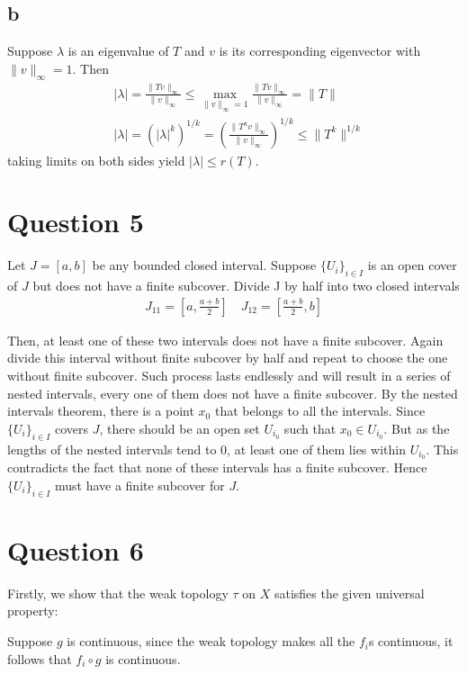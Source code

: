\documentclass{article}
\begin{document}
\subsection*{b}
Suppose $\lambda$ is an eigenvalue of $T$ and $v$ is its corresponding eigenvector with $\lVert v \rVert_\infty=1$. Then
\begin{align*}
	&|\lambda|=\frac{\lVert Tv\rVert_\infty}{\lVert v\rVert_\infty}\leq \max_{\lVert v\rVert_\infty=1}\frac{\lVert Tv\rVert_\infty}{\lVert v\rVert_\infty}=\lVert T\rVert \\
	&|\lambda |=(|\lambda|^k)^{1/k}=(\frac{\lVert T^k v\rVert_\infty}{\lVert v\rVert_\infty} )^{1/k}\leq \lVert T^k\rVert^{1/k}
\end{align*}
taking limits on both sides yield $|\lambda|\leq r(T)$.

\section*{Question 5}
Let $J=[a,b]$ be any bounded closed interval. Suppose $\{U_i\}_{i\in I}$ is an open cover of $J$ but does not have a finite subcover. Divide J by half into two closed intervals 
\begin{align*}
	J_{11}=[a,\frac{a+b}{2}] \quad  J_{12}=[\frac{a+b}{2},b]
\end{align*}

Then, at least one of these two intervals does not have a finite subcover. Again divide this interval without finite subcover by half and repeat to choose the one without finite subcover. Such process lasts endlessly and will result in a series of nested intervals, every one of them does not have a finite subcover. By the nested intervals theorem, there is a point $x_0$ that belongs to all the intervals. Since $\{U_i\}_{i\in I}$ covers $J$, there should be an open set $U_{i_0}$ such that $x_0\in U_{i_0}$. But as the lengths of the nested intervals tend to $0$, at least one of them lies within $U_{i_0}$. This contradicts the fact that none of these intervals has a finite subcover. Hence $\{U_{i}\}_{i\in I}$ must have a finite subcover for $J$.




\section*{Question 6}
Firstly, we show that the weak topology $\tau$ on $X$ satisfies the given universal property:

Suppose $g$ is continuous, since the weak topology makes all the $f_i$s continuous, it follows that $f_i\circ g$ is continuous.
\end{document}

